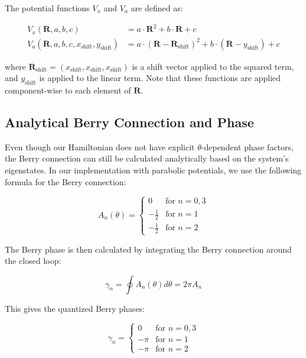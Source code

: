 \documentclass[12pt,a4paper]{article}
\begin{document}
The potential functions $V_x$ and $V_a$ are defined as:

\begin{align}
V_x(\bm{R}, a, b, c) &= a \cdot \bm{R}^2 + b \cdot \bm{R} + c \\
V_a(\bm{R}, a, b, c, x_{\text{shift}}, y_{\text{shift}}) &= a \cdot (\bm{R} - \bm{R}_{\text{shift}})^2 + b \cdot (\bm{R} - y_{\text{shift}}) + c
\end{align}

where $\bm{R}_{\text{shift}} = (x_{\text{shift}}, x_{\text{shift}}, x_{\text{shift}})$ is a shift vector applied to the squared term, and $y_{\text{shift}}$ is applied to the linear term. Note that these functions are applied component-wise to each element of $\bm{R}$.

\subsection{Analytical Berry Connection and Phase}

Even though our Hamiltonian does not have explicit $\theta$-dependent phase factors, the Berry connection can still be calculated analytically based on the system's eigenstates. In our implementation with parabolic potentials, we use the following formula for the Berry connection:

\begin{equation}
A_n(\theta) = \begin{cases}
0 & \text{for } n = 0, 3 \\
-\frac{1}{2} & \text{for } n = 1 \\
-\frac{1}{2} & \text{for } n = 2
\end{cases}
\end{equation}

The Berry phase is then calculated by integrating the Berry connection around the closed loop:

\begin{equation}
\gamma_n = \oint A_n(\theta) d\theta = 2\pi A_n
\end{equation}

This gives the quantized Berry phases:

\begin{equation}
\gamma_n = \begin{cases}
0 & \text{for } n = 0, 3 \\
-\pi & \text{for } n = 1 \\
-\pi & \text{for } n = 2
\end{cases}
\end{equation}
\end{document}
